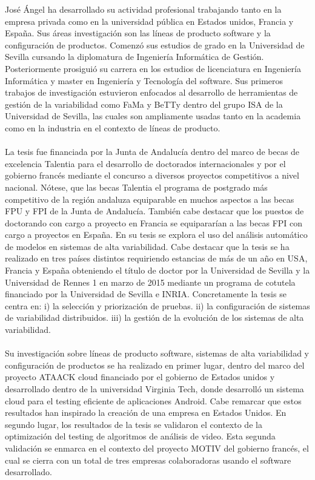 José Ángel ha desarrollado su actividad profesional trabajando tanto en la empresa privada como en la universidad pública en Estados unidos, Francia y España. Sus áreas investigación son las líneas de producto software y la configuración de productos. Comenzó sus estudios de grado en la Universidad de Sevilla cursando la diplomatura de Ingeniería Informática de Gestión. Posteriormente prosiguió su carrera en los estudios de licenciatura en Ingeniería Informática y master en Ingeniería y Tecnología del software. Sus primeros trabajos de investigación estuvieron enfocados al desarrollo de herramientas de gestión de la variabilidad como FaMa y BeTTy dentro del grupo ISA de la Universidad de Sevilla, las cuales son ampliamente usadas tanto en la academia como en la industria en el contexto de líneas de producto. 
\\\\
La tesis fue financiada por la Junta de Andalucía dentro del marco de becas de excelencia Talentia para el desarrollo de doctorados internacionales y por el gobierno francés mediante el concurso a diversos proyectos competitivos a nivel nacional. Nótese, que las becas Talentia el programa de postgrado más competitivo de la región andaluza equiparable en muchos aspectos a las becas FPU y FPI de la Junta de Andalucía. También cabe destacar que los puestos de doctorando con cargo a proyecto en Francia se equipararían a las becas FPI con cargo a proyectos en España. En su tesis se explora el uso del análisis automático de modelos en sistemas de alta variabilidad. Cabe destacar que la tesis se ha realizado en tres países distintos requiriendo estancias de más de un año en USA, Francia y España obteniendo el título de doctor por la Universidad de Sevilla y la Universidad de Rennes 1 en marzo de 2015 mediante un programa de cotutela financiado por la Universidad de Sevilla e INRIA. Concretamente la tesis se centra en: i) la selección y priorización de pruebas. ii) la configuración de sistemas de variabilidad distribuidos. iii) la gestión de la evolución de los sistemas de alta variabilidad. 
\\\\
Su investigación sobre líneas de producto software, sistemas de alta variabilidad y configuración de productos se ha realizado en primer lugar, dentro del marco del proyecto ATAACK cloud financiado por el gobierno de Estados unidos y desarrollado dentro de la universidad Virginia Tech, donde desarrolló un sistema cloud para el testing eficiente de aplicaciones Android. Cabe remarcar que estos resultados han inspirado la creación de una empresa en Estados Unidos. En segundo lugar, los resultados de la tesis se validaron el contexto de la optimización del testing de algoritmos de análisis de video. Esta segunda validación se enmarca en el contexto del proyecto MOTIV del gobierno francés, el cual se cierra con un total de tres empresas colaboradoras usando el software desarrollado.
